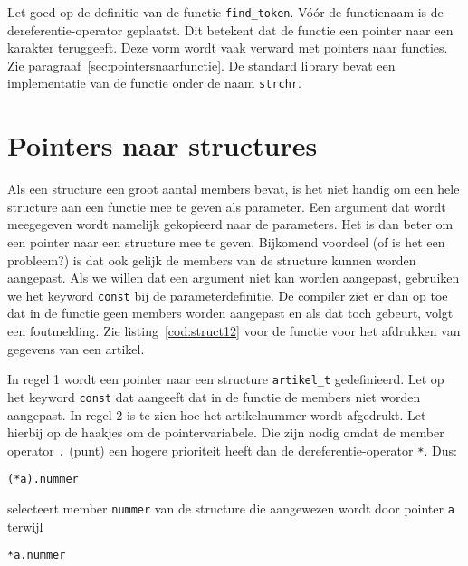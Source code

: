 
Let goed op de definitie van de functie \texttt{find\_token}. Vóór de functienaam is de dereferentie-operator geplaatst. Dit betekent dat de functie een pointer naar een karakter teruggeeft. Deze vorm wordt vaak verward met pointers naar functies. Zie paragraaf~\ref{sec:pointersnaarfunctie}. De standard library bevat een implementatie van de functie onder de naam \lstinline|strchr|.


\section{Pointers naar structures}
Als een structure een groot aantal members bevat, is het niet handig om een hele structure aan een functie mee te geven als parameter. Een argument dat wordt meegegeven wordt namelijk gekopieerd naar de parameters. Het is dan beter om een pointer naar een structure mee te geven. Bijkomend voordeel (of is het een probleem?) is dat ook gelijk de members van de structure kunnen worden aangepast. Als we willen dat een argument niet kan worden aangepast, gebruiken we het keyword \texttt{const} bij de parameterdefinitie. De compiler ziet er dan op toe dat in de functie geen members worden aangepast en als dat toch gebeurt, volgt een foutmelding. Zie listing~\ref{cod:struct12} voor de functie voor het afdrukken van gegevens van een artikel.


In regel 1 wordt een pointer naar een structure \texttt{artikel\_t} gedefinieerd. Let op het keyword \texttt{const} dat aangeeft dat in de functie de members niet worden aangepast. In regel 2 is te zien hoe het artikelnummer wordt afgedrukt. Let hierbij op de haakjes om de pointervariabele. Die zijn nodig omdat de member operator \texttt{.} (punt) een hogere prioriteit heeft dan de dereferentie-operator \texttt{*}. Dus:

\hspace*{1em}\texttt{(*a).nummer}

selecteert member \texttt{nummer} van de structure die aangewezen wordt door pointer \texttt{a} terwijl

\hspace*{1em}\texttt{*a.nummer}

